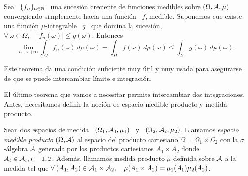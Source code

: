 \begin{teorema}
  Sea  \ $\{  f_n \}_{n  \in  \mathbb{N}}$ \  una sucesi\'on  creciente de  funciones
  medibles sobre $(\Omega,\mathcal{A},\mu)$  convergiendo simplemente hacia una funci\'on
  \ $f$, medible.  Suponemos que existe una funci\'on  $\mu$-integrable  \ $g$ \
  que  domina  la  sucesi\'on,  \ie  $\forall  \, \omega  \in  \Omega,  \quad  |
  f_n(\omega) | \le g(\omega)$. Entonces
  \[
  \lim_{n  \to  +\infty}  \int_\Omega  f_n(\omega) \,  d\mu(\omega)  =  \int_\Omega
  f(\omega) \, d\mu(\omega) \le \int_\Omega  g(\omega)  \, d\mu(\omega).
  \]
\end{teorema}
%
Este  teorema  da  una  condici\'on  suficiente  muy \'util  y  muy  usada  para
asegurarse de que se puede intercambiar l\'imite e integraci\'on.

El   \'ultimo  teorema   que  vamos   a  necesitar   permite   intercambiar  dos
integraciones.   Antes,  necesitamos  definir  la noci\'on  de  espacio  medible
producto y medida producto.
%
\begin{definicion}
  Sean dos  espacios de  medida \  $(\Omega_1, \mathcal{A}_1, \mu_1)$  \ y  \ $(\Omega_2,
  \mathcal{A}_2,  \mu_2)$. Llamamos  {\it espacio  medible producto}  $(\Omega ,  \mathcal{A})$ al
  espacio del  producto cartesiano  $\Omega = \Omega_1  \times \Omega_2$  con la
  $\sigma$-\'algebra  $\mathcal{A}$ generada  por los  productos cartesianos  $A_1 \times
  A_2$ donde $A_i \in \mathcal{A}_i, i  = 1, 2$. Adem\'as, llamamos medida producto $\mu$
  definida sobre $\mathcal{A}$ a la medida  tal que $\forall \: (A_1,A_2) \in \mathcal{A}_1 \times
  \mathcal{A}_2, \quad \mu(A_1 \times A_2) = \mu_1(A_1) \mu_2(A_2)$.
\end{definicion}

